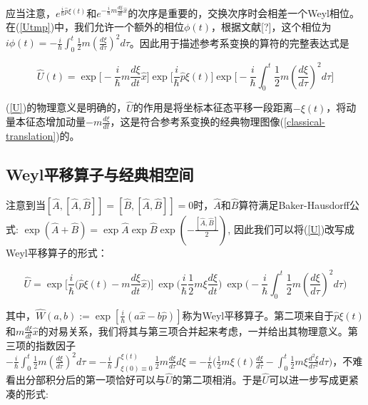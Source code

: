 \documentclass[a4paper]{article}
\begin{document}
        应当注意，$e^{\frac{i}{\hbar}\hat{p}\xi(t)}$和$e^{-\frac{i}{\hbar}m\frac{d\xi}{dt}\hat{x}}$的次序是重要的，交换次序时会相差一个Weyl相位。在(\ref{Utmp})中，我们允许一个额外的相位$\phi(t)$，根据文献[?]，这个相位为$i\phi(t)=-\frac{i}{\hbar}\int_0^t\frac{1}{2}m(\frac{d \xi}{d\tau})^2 d\tau$。因此用于描述参考系变换的算符的完整表达式是

        \begin{equation}\label{U}
            \hat{U}(t) = \exp\biggl[-\frac{i}{\hbar}m\frac{d\xi}{dt}\hat{x}\biggr] \exp\biggl[\frac{i}{\hbar}\hat{p}\xi(t)\biggr] \exp\biggl[-\frac{i}{\hbar}\int_0^t\frac{1}{2}m(\frac{d \xi}{d\tau})^2 d\tau\biggr]
        \end{equation}

        (\ref{U})的物理意义是明确的，$\hat{U}$的作用是将坐标本征态平移一段距离$-\xi(t)$，将动量本征态增加动量$-m\frac{d \xi}{dt}$，这是符合参考系变换的经典物理图像(\ref{classical-translation})的。


    \subsection{Weyl平移算子与经典相空间}

        注意到当$[\hat{A}, [\hat{A}, \hat{B}]]=[\hat{B}, [\hat{A}, \hat{B}]]=0$时，$\hat{A}$和$\hat{B}$算符满足Baker-Hausdorff公式: $\exp(\hat{A}+\hat{B})=\exp\hat{A} \exp\hat{B} \exp(-\frac{[\hat{A}, \hat{B}]}{2})$, 因此我们可以将(\ref{U})改写成Weyl平移算子的形式：

        \begin{equation}
            \hat{U}=\exp\bigg[\frac{i}{\hbar}\bigg(\hat{p}\xi(t)-m\frac{d\xi}{dt}\hat{x} \bigg) \bigg]\ \exp\bigg(\frac{i}{\hbar}\frac{1}{2}m\xi\frac{d\xi}{dt} \bigg)\ \exp\bigg(-\frac{i}{\hbar}\int_0^t\frac{1}{2}m(\frac{d \xi}{d\tau})^2 d\tau \bigg)
        \end{equation}

        其中，$\hat{W}(a,b):=\exp[\frac{i}{\hbar}(a\hat{x}-b\hat{p})]$称为Weyl平移算子。第二项来自于$\hat{p}\xi(t)$和$m\frac{d\xi}{dt}\hat{x}$的对易关系，我们将其与第三项合并起来考虑，一并给出其物理意义。第三项的指数因子$-\frac{i}{\hbar}\int_0^t\frac{1}{2}m(\frac{d \xi}{d\tau})^2 d\tau = -\frac{i}{\hbar}\int_{\xi(0)\equiv 0}^{\xi(t)}\frac{1}{2}m\frac{d \xi}{d\tau} d\xi = -\frac{i}{\hbar}\bigg(\frac{1}{2}m\xi(t)\frac{d \xi}{d\tau}-\int_0^t\frac{1}{2}m\xi\frac{d^2\xi}{d\tau^2} d\tau\bigg)$，不难看出分部积分后的第一项恰好可以与$\hat{U}$的第二项相消。于是$\hat{U}$可以进一步写成更紧凑的形式:
\end{document}
